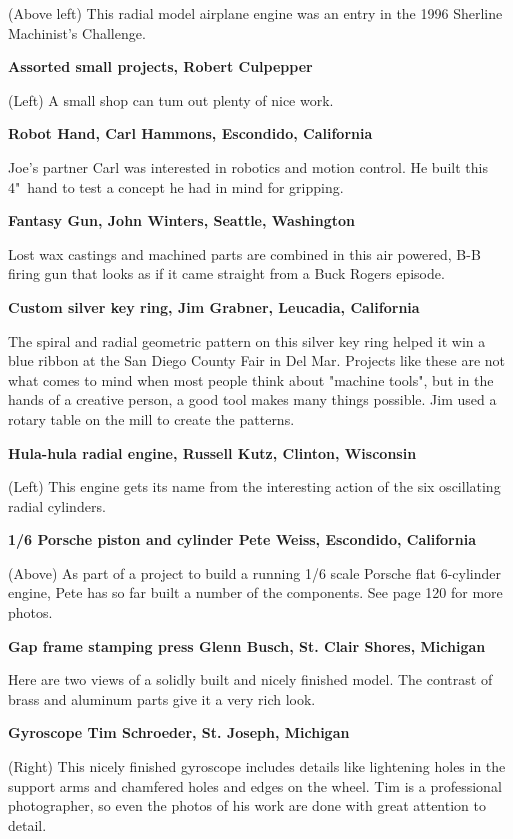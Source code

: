 (Above left) This radial model airplane engine was an entry in the 1996 Sherline
Machinist's Challenge.

\bigskip
\textbf{Assorted small projects, Robert Culpepper}

(Left) A small shop can tum out plenty of nice work.

\bigskip
\textbf{Robot Hand, Carl Hammons, Escondido, California}

Joe's partner Carl was interested in robotics and motion control. He built this
4"\ hand to test a concept he had in mind for gripping.

\bigskip
\textbf{Fantasy Gun, John Winters, Seattle, Washington}

Lost wax castings and machined parts are combined in this air powered, B-B
firing gun that looks as if it came straight from a Buck Rogers episode.

\bigskip
\textbf{Custom silver key ring, Jim Grabner, Leucadia, California}

The spiral and radial geometric pattern on this silver key ring helped it win a
blue ribbon at the San Diego County Fair in Del Mar. Projects like these are not
what comes to mind when most people think about "machine tools", but in the
hands of a creative person, a good tool makes many things possible. Jim used a
rotary table on the mill to create the patterns.

\bigskip
\textbf{Hula-hula radial engine, Russell Kutz, Clinton, Wisconsin}

(Left) This engine gets its name from the interesting action of the six
oscillating radial cylinders.

\bigskip
\textbf{1/6 Porsche piston and cylinder Pete Weiss, Escondido, California}

(Above) As part of a project to build a running 1/6 scale Porsche flat
6-cylinder engine, Pete has so far built a number of the components. See page
120 for more photos.

\bigskip
\textbf{Gap frame stamping press
Glenn Busch, St. Clair Shores, Michigan}

Here are two views of a solidly built and nicely finished model. The contrast of
brass and aluminum parts give it a very rich look.

\bigskip
\textbf{Gyroscope
Tim Schroeder, St. Joseph, Michigan}

(Right) This nicely finished gyroscope includes details like lightening holes in
the support arms and chamfered holes and edges on the wheel. Tim is a
professional photographer, so even the photos of his work are done with great
attention to detail.


